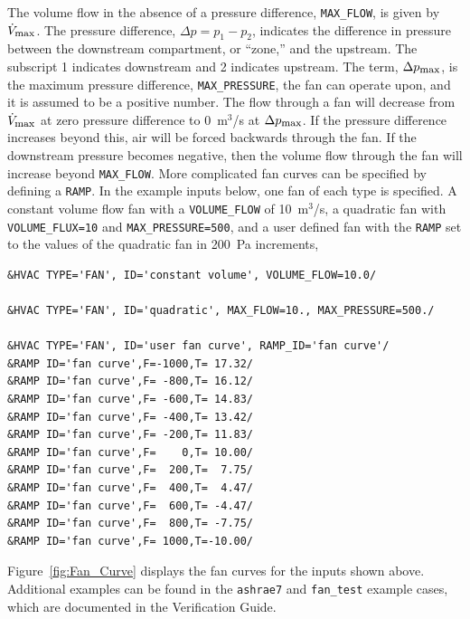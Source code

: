 \documentclass[11pt]{book}
\newcommand{\ct}{\tt\small}
\begin{document}
The volume flow in the absence of a pressure difference, {\ct MAX\_FLOW}, is given by $\dot{V}_{\hbox{\footnotesize max}}$.  The pressure difference, $\Delta p=p_1-p_2$, indicates the difference in
pressure between the downstream compartment, or ``zone,'' and the upstream. The subscript 1 indicates downstream and 2 indicates upstream.
The term, $\Delta p_{\hbox{\footnotesize max}}$, is the maximum
pressure difference, {\ct MAX\_PRESSURE}, the fan can operate upon, and it is assumed to be a positive number.
The flow through a fan will decrease from $\dot{V}_{\hbox{\footnotesize max}}$ at zero pressure difference to 0~m$^3$/s at $\Delta p_{\hbox{\footnotesize max}}$.
If the pressure difference increases beyond this, air will be forced backwards through the fan.   If the downstream pressure becomes negative, then the volume flow through the fan will increase beyond {\ct MAX\_FLOW}. More complicated fan curves can be specified by defining a {\ct RAMP}.  In the example inputs below, one fan of each type is specified.  A constant volume flow fan with a {\ct VOLUME\_FLOW} of 10~m$^3$/s, a quadratic fan with {\ct VOLUME\_FLUX=10} and {\ct MAX\_PRESSURE=500}, and a user defined fan with the {\ct RAMP} set to the values of the quadratic fan in 200~Pa increments,

\footnotesize
\begin{verbatim}
&HVAC TYPE='FAN', ID='constant volume', VOLUME_FLOW=10.0/

&HVAC TYPE='FAN', ID='quadratic', MAX_FLOW=10., MAX_PRESSURE=500./

&HVAC TYPE='FAN', ID='user fan curve', RAMP_ID='fan curve'/
&RAMP ID='fan curve',F=-1000,T= 17.32/
&RAMP ID='fan curve',F= -800,T= 16.12/
&RAMP ID='fan curve',F= -600,T= 14.83/
&RAMP ID='fan curve',F= -400,T= 13.42/
&RAMP ID='fan curve',F= -200,T= 11.83/
&RAMP ID='fan curve',F=    0,T= 10.00/
&RAMP ID='fan curve',F=  200,T=  7.75/
&RAMP ID='fan curve',F=  400,T=  4.47/
&RAMP ID='fan curve',F=  600,T= -4.47/
&RAMP ID='fan curve',F=  800,T= -7.75/
&RAMP ID='fan curve',F= 1000,T=-10.00/
\end{verbatim}\normalsize

Figure~\ref{fig:Fan_Curve} displays the fan curves for the inputs shown above.  Additional examples can be found in the {\ct ashrae7} and {\ct fan\_test} example cases, which are documented in the Verification Guide.
\end{document}
